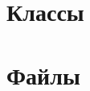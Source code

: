 \documentclass[a4paper]{book}
\begin{document}
\chapter{Классы}

\chapter{Файлы}










\printindex
\end{document}
